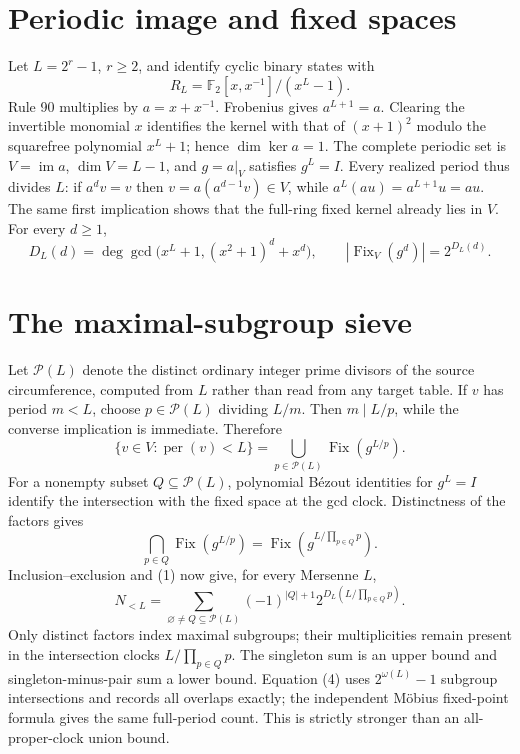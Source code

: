 \documentclass[10pt]{article}
\begin{document}
\section{Periodic image and fixed spaces}
Let $L=2^r-1$, $r\geq2$, and identify cyclic binary states with
\[
R_L=\mathbb F_2[x,x^{-1}]/(x^L-1).
\]
Rule 90 multiplies by $a=x+x^{-1}$.  Frobenius gives
$a^{L+1}=a$.  Clearing the invertible monomial $x$ identifies the kernel
with that of $(x+1)^2$ modulo the squarefree polynomial $x^L+1$; hence
$\dim\ker a=1$.  The complete periodic set is $V=\operatorname{im}a$,
$\dim V=L-1$, and $g=a|_V$ satisfies $g^L=I$.  Every realized period thus
divides $L$: if $a^dv=v$ then $v=a(a^{d-1}v)\in V$, while
$a^L(au)=a^{L+1}u=au$.  The same first implication shows that the full-ring
fixed kernel already lies in $V$.  For every $d\geq1$,
\begin{equation}
D_L(d)=\deg\gcd\bigl(x^L+1,(x^2+1)^d+x^d\bigr),\qquad
|\operatorname{Fix}_V(g^d)|=2^{D_L(d)}.             \tag{1}
\end{equation}

\section{The maximal-subgroup sieve}
Let $\mathcal P(L)$ denote the distinct ordinary integer prime divisors of
the source circumference, computed from $L$ rather than read from any target
table.  If $v$ has period $m<L$, choose
$p\in\mathcal P(L)$ dividing $L/m$.  Then $m\mid L/p$, while the converse
implication is immediate.  Therefore
\begin{equation}
\{v\in V:\operatorname{per}(v)<L\}
=\bigcup_{p\in\mathcal P(L)}\operatorname{Fix}(g^{L/p}).       \tag{2}
\end{equation}
For a nonempty subset $Q\subseteq\mathcal P(L)$, polynomial B\'ezout
identities for $g^L=I$ identify the intersection with the fixed space at the
gcd clock.  Distinctness of the factors gives
\[
\bigcap_{p\in Q}\operatorname{Fix}(g^{L/p})
=\operatorname{Fix}\left(g^{L/\prod_{p\in Q}p}\right).        \tag{3}
\]
Inclusion--exclusion and (1) now give, for every Mersenne $L$,
\begin{equation}
N_{<L}=\sum_{\varnothing\ne Q\subseteq\mathcal P(L)}
(-1)^{|Q|+1}2^{D_L(L/\prod_{p\in Q}p)}.                       \tag{4}
\end{equation}
Only distinct factors index maximal subgroups; their multiplicities remain
present in the intersection clocks $L/\prod_{p\in Q}p$.
The singleton sum is an upper bound and singleton-minus-pair sum a lower
bound.  Equation (4) uses $2^{\omega(L)}-1$ subgroup intersections and
records all overlaps exactly; the independent M\"obius fixed-point formula
gives the same full-period count.  This is strictly stronger than an
all-proper-clock union bound.
\end{document}
